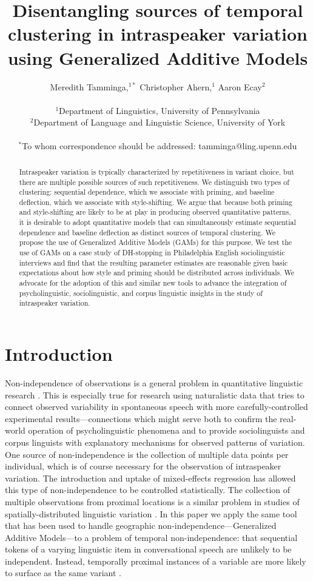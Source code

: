 \documentclass[12pt]{article}
\title{Disentangling sources of temporal clustering in intraspeaker variation using Generalized Additive Models}
\author{Meredith Tamminga,$^{1\ast}$ Christopher Ahern,$^{1}$ Aaron Ecay$^{2}$\\
\\
\normalsize{$^{1}$Department of Linguistics, University of Pennsylvania}\\

\normalsize{$^{2}$Department of Language and Linguistic Science, University of York}\\
\\
\normalsize{$^\ast$To whom correspondence should be addressed: tamminga@ling.upenn.edu}}
\author{}
\date{}
\begin{document}
 


\baselineskip24pt


\maketitle 

\begin{abstract}
Intraspeaker variation is typically characterized by repetitiveness in variant choice, but there are multiple possible sources of such repetitiveness. We distinguish two types of clustering: sequential dependence, which we associate with priming, and baseline deflection, which we associate with style-shifting. We argue that because both priming and style-shifting are likely to be at play in producing observed quantitative patterns, it is desirable to adopt quantitative models that can simultaneously estimate sequential dependence and baseline deflection as distinct sources of temporal clustering. We propose the use of Generalized Additive Models (GAMs) for this purpose. We test the use of GAMs on a case study of DH-stopping in Philadelphia English sociolinguistic interviews and find that the resulting parameter estimates are reasonable given basic expectations about how style and priming should be distributed across individuals. We advocate for the adoption of this and similar new tools to advance the integration of psycholinguistic, sociolinguistic, and corpus linguistic insights in the study of intraspeaker variation.

\end{abstract}

\section{Introduction} \label{intro}


    
Non-independence of observations is a general problem in quantitative linguistic research \citep{paolillo:2002}. This is especially true for  research using naturalistic data that tries to connect observed variability in spontaneous speech with more carefully-controlled experimental results---connections which might serve both to confirm the real-world operation of psycholinguistic phenomena and to provide sociolinguists and corpus linguists with explanatory mechanisms for  observed patterns of variation. One source of non-independence is the collection of multiple data points per individual, which is of course necessary for the observation of intraspeaker variation. The introduction and uptake of mixed-effects regression \citep{Baayen:2008,Barr:2013} has allowed this type of non-independence to be controlled statistically. The collection of multiple observations from proximal locations is a similar problem in studies of spatially-distributed linguistic variation \citep{Wieling:2014}. In this paper we apply the same tool that has been used to handle geographic non-independence---Generalized Additive Models---to a problem of temporal non-independence: that sequential tokens of a varying linguistic item  in conversational speech are unlikely to be independent. Instead, temporally proximal instances of a variable are more likely to surface as the same variant \citep{Sankoff:1978}. 
    
\end{document}
